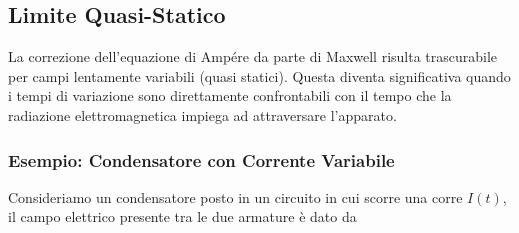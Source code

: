 \subsection{Limite Quasi-Statico}

La correzione dell'equazione di Amp\'ere da parte di Maxwell risulta trascurabile per campi lentamente variabili (quasi statici). Questa diventa significativa quando i tempi di variazione sono direttamente confrontabili con il tempo che la radiazione elettromagnetica impiega ad attraversare l'apparato. 

\subsubsection{Esempio: Condensatore con Corrente Variabile}
Consideriamo un condensatore posto in un circuito in cui scorre una corre $I(t)$, il campo elettrico presente tra le due armature \`e dato da 

